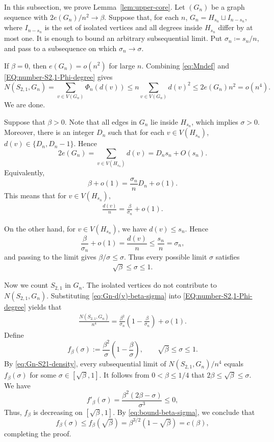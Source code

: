 \documentclass[10pt,a4paper]{article}
\begin{document}
In this subsection, we prove Lemma~\ref{lem:upper-core}. Let \((G_n)\) be a graph sequence with
$2e(G_n)/n^2\to \beta$.
Suppose that, for each \(n\),
$G_n=H_{s_n}\sqcup I_{n-s_n}$, 
where \(I_{n-s_n}\) is the set of isolated vertices and all degrees inside \(H_{s_n}\)
differ by at most one.  It is enough to bound an arbitrary subsequential limit. Put $\sigma_n\coloneqq s_n/n$, and pass to a subsequence on which \(\sigma_n\to \sigma\).

If \(\beta=0\), then \(e(G_n)=o(n^2)\) for large $n$. Combining \eqref{eq:Mndef} and \eqref{EQ:number-S2,1-Phi-degree} gives 
\[
N(S_{2,1},G_n)
=\sum_{v\in V(G_n)}\Phi_n(d(v))
\le n\sum_{v\in V(G_n)}d(v)^2
\le 2e(G_n)n^2
=o(n^4).
\]
We are done.

Suppose that \(\beta>0\). Note that  all edges in $G_n$ lie inside \(H_{s_n}\), which implies  \(\sigma>0\). Moreover, there is an integer \(D_n\) such that for each  \(v\in V(H_{s_n})\), $d(v)\in\{D_n,D_n-1\}$.
Hence
\[
2e(G_n)=\sum_{v\in V(H_{s_n})}d(v)=D_ns_n+O(s_n).
\]
Equivalently, 
\[
\beta+o(1)
=\frac{\sigma_n}{n}D_n+o(1).
\]
This means that  for \(v\in V(H_{s_n})\),
\begin{align}\label{eq:Gn-d(v)-beta-sigma}
\frac{d(v)}{n}=\frac{\beta}{\sigma_n}+o(1).
\end{align}

On the other hand, for \(v\in V(H_{s_n})\), we have \(d(v)\le s_n\). Hence
\[
\frac{\beta}{\sigma_n}+o(1)=\frac{d(v)}{n}\le \frac{s_n}{n}=\sigma_n,
\]
and passing to the limit gives
$\beta/\sigma\le \sigma$.
Thus every possible limit \(\sigma\) satisfies
\begin{align}\label{eq:bound-beta-sigma}
\sqrt{\beta}\le \sigma\le 1. 
\end{align}





Now we count $S_{2,1}$ in $G_n$.  The isolated vertices do not contribute to \(N(S_{2,1},G_n)\). Substituting \eqref{eq:Gn-d(v)-beta-sigma} into \eqref{EQ:number-S2,1-Phi-degree} yields that 
\begin{align}\label{eq:Gn-S21-density}
\frac{N(S_{2,1},G_n)}{n^4}
=
\frac{\beta^2}{\sigma_n}
\left(1-\frac{\beta}{\sigma_n}\right)
+o(1).
\end{align}
Define
\[
f_\beta(\sigma):=\frac{\beta^2}{\sigma}\left(1-\frac{\beta}{\sigma}\right),
\qquad \sqrt{\beta}\le \sigma\le 1.
\]
By \eqref{eq:Gn-S21-density}, every subsequential limit of \(N(S_{2,1},G_n)/n^4\)  equals
\(f_\beta(\sigma)\) for some \(\sigma\in[\sqrt{\beta},1]\). It follows from \(0<\beta\le 1/4\) that  \(2\beta\le \sqrt{\beta}\le \sigma\). We have 
\[
f'_\beta(\sigma)=\frac{\beta^2(2\beta-\sigma)}{\sigma^3}\le 0,
\]
Thus, \(f_\beta\) is decreasing on
\([\sqrt{\beta},1]\). By \eqref{eq:bound-beta-sigma}, we conclude that 
\[
f_\beta(\sigma)\le f_\beta(\sqrt{\beta})
=\beta^{3/2}(1-\sqrt{\beta})
=c(\beta), 
\]
completing the proof. 
\end{document}
